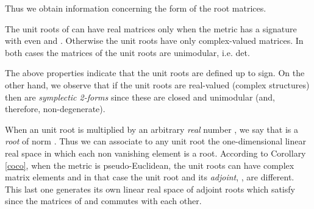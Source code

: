 \documentclass[a4paper,12pt]{article}
\begin{document}
Thus we obtain information concerning the form of the root matrices.  
\begin{cor}\label{coco}
The unit roots of \coordHE{} can have real matrices only when the metric \myHighlight{$\eta$}\coordHE{} 
has a signature with even \coordHE{} and \coordHE{}.  
Otherwise the unit roots have only complex-valued matrices. 
In both cases the matrices of the unit roots are unimodular, 
i.e. {\rm det}\coordHE{}. 
\end{cor} 
The above properties indicate that the unit roots are defined up to 
sign. On the other hand, we observe that if the unit roots are real-valued 
(complex structures) then 
\coordHE{} are 
{\em symplectic 2-forms} since these are closed and unimodular (and, therefore, 
non-degenerate).

When an unit root \coordHE{} is multiplied by an arbitrary {\em real} number 
\coordHE{}, we say that \coordHE{} is a {\em root} of norm 
\myHighlight{$\|\xi\|=|\alpha|$}\coordHE{}. Thus we can associate to any unit root \coordHE{} 
the one-dimensional linear real space \coordHE{} in which each non vanishing element is a root. According to
Corollary \ref{coco}, when the metric \myHighlight{$\eta$}\coordHE{} is pseudo-Euclidean,
the unit roots can have complex matrix elements and in that case the unit
root \coordHE{} and its {\em adjoint}, \coordHE{}, are different. This last one generates
its own linear real space \coordHE{}  of adjoint roots  which satisfy 
\coordHE{} since the matrices of \coordHE{} and \coordHE{} commutes with each 
other.
\end{document}
